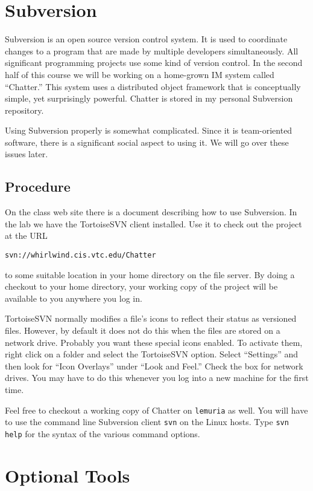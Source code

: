 \documentclass[twocolumn]{article}
\begin{document}
\section{Subversion}

Subversion is an open source version control system. It is used to coordinate changes to a
program that are made by multiple developers simultaneously. All significant programming
projects use some kind of version control. In the second half of this course we will be working
on a home-grown IM system called ``Chatter.'' This system uses a distributed object framework
that is conceptually simple, yet surprisingly powerful. Chatter is stored in my personal
Subversion repository.

Using Subversion properly is somewhat complicated. Since it is team-oriented software, there is
a significant social aspect to using it. We will go over these issues later.

\subsection*{Procedure}

On the class web site there is a document describing how to use Subversion. In the lab we have
the TortoiseSVN client installed. Use it to check out the project at the URL

\vspace{1.0ex}
\centerline{\tt svn://whirlwind.cis.vtc.edu/Chatter}

to some suitable location in your home directory on the file server. By doing a checkout to your
home directory, your working copy of the project will be available to you anywhere you log in.

TortoiseSVN normally modifies a file's icons to reflect their status as versioned files.
However, by default it does not do this when the files are stored on a network drive. Probably
you want these special icons enabled. To activate them, right click on a folder and select the
TortoiseSVN option. Select ``Settings'' and then look for ``Icon Overlays'' under ``Look and
Feel.'' Check the box for network drives. You may have to do this whenever you log into a new
machine for the first time.

Feel free to checkout a working copy of Chatter on \texttt{lemuria} as well. You will have to
use the command line Subversion client \texttt{svn} on the Linux hosts. Type \texttt{svn help}
for the syntax of the various command options.

\section{Optional Tools}
\end{document}
